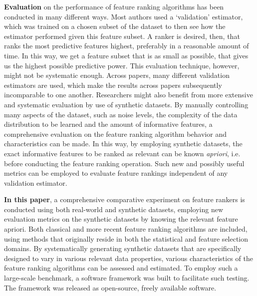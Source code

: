 \documentclass[../main.tex]{subfiles}
\begin{document}
\textbf{Evaluation} on the performance of feature ranking algorithms has been conducted in many different ways. Most authors used a `validation' estimator, which was trained on a chosen subset of the dataset to then see how the estimator performed given this feature subset. A ranker is desired, then, that ranks the most predictive features highest, preferably in a reasonable amount of time. In this way, we get a feature subset that is as small as possible, that gives us the highest possible predictive power. This evaluation technique, however, might not be systematic enough. Across papers, many different validation estimators are used, which make the results across papers subsequently incomparable to one another. Researchers might also benefit from more extensive and systematic evaluation by use of synthetic datasets. By manually controlling many aspects of the dataset, such as noise levels, the complexity of the data distribution to be learned and the amount of informative features, a comprehensive evaluation on the feature ranking algorithm behavior and characteristics can be made. In this way, by employing synthetic datasets, the exact informative features to be ranked as relevant can be known \textit{\gls{apriori}}, i.e. before conducting the feature ranking operation. Such new and possibly useful metrics can be employed to evaluate feature rankings independent of any validation estimator.



\textbf{In this paper}, a comprehensive comparative experiment on feature rankers is conducted using both real-world and synthetic datasets, employing new evaluation metrics on the synthetic datasets by knowing the relevant feature apriori. Both classical and more recent feature ranking algorithms are included, using methods that originally reside in both the statistical and feature selection domains. By systematically generating synthetic datasets that are specifically designed to vary in various relevant data properties, various characteristics of the feature ranking algorithms can be assessed and estimated. To employ such a large-scale benchmark, a software framework was built to facilitate such testing. The framework was released as open-source, freely available software.
\end{document}
